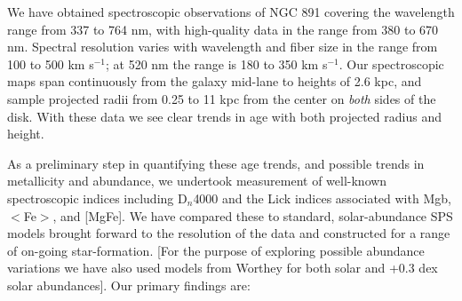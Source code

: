 
We have obtained spectroscopic observations of NGC 891 covering the
wavelength range from 337 to 764 nm, with high-quality data in the
range from 380 to 670 nm. Spectral resolution varies with wavelength
and fiber size in the range from 100 to 500 km s$^{-1}$; at 520 nm the
range is 180 to 350 km s$^{-1}$. Our spectroscopic maps span continuously
from the galaxy mid-lane to heights of 2.6 kpc, and sample projected
radii from 0.25 to 11 kpc from the center on {\it both} sides of the
disk. With these data we see clear trends in age with both projected
radius and height.

As a preliminary step in quantifying these age trends, and possible
trends in metallicity and abundance, we undertook measurement of
well-known spectroscopic indices including D$_n$4000 and the Lick
indices associated with Mgb, $<$Fe$>$, and [MgFe]. We have compared
these to standard, solar-abundance SPS models brought forward to the
resolution of the data and constructed for a range of on-going
star-formation. [For the purpose of exploring possible abundance
  variations we have also used models from Worthey for both solar and
  +0.3 dex solar abundances]. Our primary findings are:


